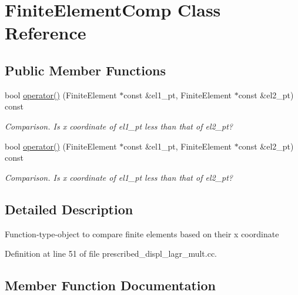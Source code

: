 \hypertarget{classFiniteElementComp}{}\section{Finite\+Element\+Comp Class Reference}
\label{classFiniteElementComp}
\subsection*{Public Member Functions}
\begin{DoxyCompactItemize}
\item 
bool \hyperlink{classFiniteElementComp_a23bc6293da4cbec67f9e43653778440f}{operator()} (Finite\+Element $\ast$const \&el1\+\_\+pt, Finite\+Element $\ast$const \&el2\+\_\+pt) const
\begin{DoxyCompactList}\small\item\em Comparison. Is x coordinate of el1\+\_\+pt less than that of el2\+\_\+pt? \end{DoxyCompactList}\item 
bool \hyperlink{classFiniteElementComp_a23bc6293da4cbec67f9e43653778440f}{operator()} (Finite\+Element $\ast$const \&el1\+\_\+pt, Finite\+Element $\ast$const \&el2\+\_\+pt) const
\begin{DoxyCompactList}\small\item\em Comparison. Is x coordinate of el1\+\_\+pt less than that of el2\+\_\+pt? \end{DoxyCompactList}\end{DoxyCompactItemize}


\subsection{Detailed Description}
Function-\/type-\/object to compare finite elements based on their x coordinate 

Definition at line 51 of file prescribed\+\_\+displ\+\_\+lagr\+\_\+mult.\+cc.



\subsection{Member Function Documentation}
\mbox{\label{classFiniteElementComp_a23bc6293da4cbec67f9e43653778440f}} 
